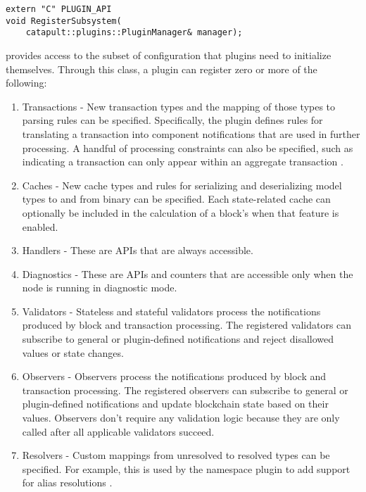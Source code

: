 \begin{lstlisting}
extern "C" PLUGIN_API
void RegisterSubsystem(
	catapult::plugins::PluginManager& manager);
\end{lstlisting}

 provides access to the subset of configuration that plugins need to initialize themselves.
Through this class, a plugin can register zero or more of the following:

\begin{enumerate}
	\item{Transactions -
		New transaction types and the mapping of those types to parsing rules can be specified.
		Specifically, the plugin defines rules for translating a transaction into component notifications that are used in further processing.
		A handful of processing constraints can also be specified, such as indicating a transaction can only appear within an aggregate transaction .
	}
	\item{Caches -
		New cache types and rules for serializing and deserializing model types to and from binary can be specified.
		Each state-related cache can optionally be included in the calculation of a block's   when that feature is enabled.
	}
	\item{Handlers - These are APIs that are always accessible.}
	\item{Diagnostics - These are APIs and counters that are accessible only when the node is running in diagnostic mode.}
	\item{Validators -
		Stateless and stateful validators process the notifications produced by block and transaction processing.
		The registered validators can subscribe to general or plugin-defined notifications and reject disallowed values or state changes.
	}
	\item{Observers -
		Observers process the notifications produced by block and transaction processing.
		The registered observers can subscribe to general or plugin-defined notifications and update blockchain state based on their values.
		Observers don't require any validation logic because they are only called after all applicable validators succeed.
	}
	\item{Resolvers -
		Custom mappings from unresolved to resolved types can be specified.
		For example, this is used by the namespace plugin to add support for alias resolutions
.
	}
\end{enumerate}

